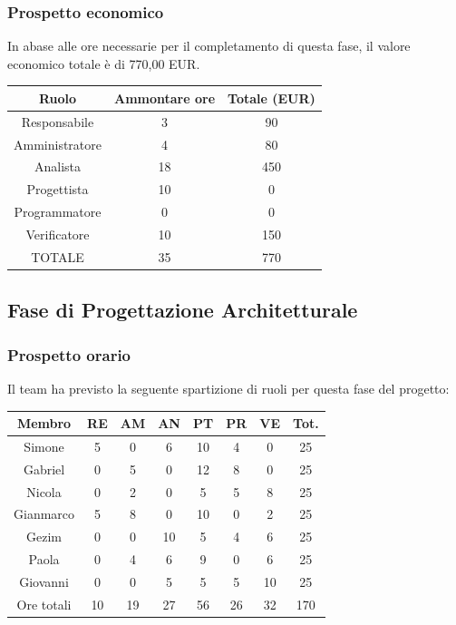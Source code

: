 \subsubsection{Prospetto economico}
In abase alle ore necessarie per il completamento di questa fase, il valore economico totale è di 770,00 EUR.
\begin{center}
\begin{tabular}{ |c|c|c|  }
 \hline
 Ruolo 		& Ammontare ore 	& Totale (EUR)\\
 	\hline
 \hline
 	Responsabile	& 3 		& 90\\
	Amministratore	& 4		& 80\\
	Analista		& 18 	& 450\\
	Progettista		& 10		& 0\\
	Programmatore	& 0		& 0\\
	Verificatore	& 10		& 150\\
 \hline\hline
 TOTALE		& 35		& 770\\
  \hline
\end{tabular}
\end{center}
\newpage
\subsection{Fase di Progettazione Architetturale}
\subsubsection{Prospetto orario}
Il team ha previsto la seguente spartizione di ruoli per questa fase del progetto:
\\
\begin{center}
\begin{tabular}{ |c|c|c|c|c|c|c|c|  }
 \hline
 Membro 		& RE 	& AM 	& AN 	& PT 	& PR 	& VE 	& Tot.\\
 \hline\hline
 Simone			& 5 		& 0		& 6 	& 10 	& 4 		& 0 		& 25\\
 Gabriel		& 0 		& 5 		& 0 	& 12		& 8 		& 0 		& 25\\
 Nicola			& 0 		& 2 		& 0 	& 5 		& 5 		& 8 		& 25\\
 Gianmarco		& 5 		& 8 		& 0 	& 10 	& 0 		& 2 		& 25\\
 Gezim			& 0 		& 0 		& 10 	& 5 		& 4 		& 6	 	& 25\\
 Paola			& 0 		& 4 		& 6 	& 9 		& 0 		& 6 		& 25\\
 Giovanni		& 0 		& 0	 	& 5 	& 5 		& 5 		& 10  	& 25\\
 \hline\hline
 Ore totali		& 10		& 19		& 27 	& 56	 	& 26 	& 32 	& 170\\
  \hline
\end{tabular}
\end{center}

